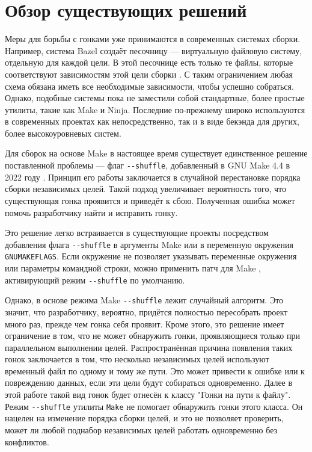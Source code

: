 \section{Обзор существующих решений}
\label{sec:Chapter2} 


Меры для борьбы с гонками уже принимаются в современных системах сборки. Например, система Bazel создаёт песочницу --- виртуальную файловую систему, отдельную для каждой цели. В этой песочнице есть только те файлы, которые соответствуют зависимостям этой цели сборки \cite{bazel-sandbox}. С таким ограничением любая схема обязана иметь все необходимые зависимости, чтобы успешно собраться. Однако, подобные системы пока не заместили собой стандартные, более простые утилиты, такие как Make и Ninja. Последние по-прежнему широко используются в современных проектах как непосредственно, так и в виде бекэнда для других, более высокоуровневых систем.

Для сборок на основе Make в настоящее время существует единственное решение поставленной проблемы --- флаг \texttt{{-}{-}shuffle}, добавленный в GNU Make 4.4 в 2022 году \cite{trofi-make-shuffle}. Принцип его работы заключается в случайной перестановке порядка сборки независимых целей. Такой подход увеличивает вероятность того, что существующая гонка проявится и приведёт к сбою. Полученная ошибка может помочь разработчику найти и исправить гонку.

Это решение легко встраивается в существующие проекты посредством добавления флага \texttt{{-}{-}shuffle} в аргументы Make или в переменную окружения \texttt{GNUMAKEFLAGS}. Если окружение не позволяет указывать переменные окружения или параметры командной строки, можно применить патч для Make \cite{make-shuffle-patch}, активирующий режим \texttt{{-}{-}shuffle} по умолчанию.

Однако, в основе режима Make \texttt{{-}{-}shuffle} лежит случайный алгоритм. Это значит, что разработчику, вероятно, придётся полностью пересобрать проект много раз, прежде чем гонка себя проявит. Кроме этого, это решение имеет ограничение в том, что не может обнаружить гонки, проявляющиеся только при параллельном выполнении целей. Распространённая причина появления таких гонок заключается в том, что несколько независимых целей используют временный файл по одному и тому же пути. Это может привести к ошибке или к повреждению данных, если эти цели будут собираться одновременно. Далее в этой работе такой вид гонок будет отнесён к классу "Гонки на пути к файлу". Режим \texttt{{-}{-}shuffle} утилиты \texttt{Make} не помогает обнаружить гонки этого класса. Он нацелен на изменение порядка сборки целей, и это не позволяет проверить, может ли любой поднабор независимых целей работать одновременно без конфликтов.